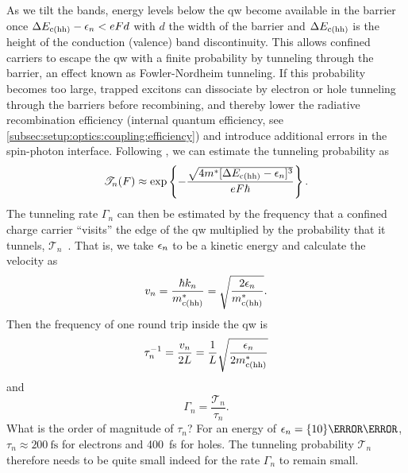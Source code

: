 As we tilt the bands, energy levels below the \gls{qw} become available in the barrier once $\Delta E_{\mathrm{c}(\mathrm{hh})} - \epsilon_{n} < eFd$ with $d$ the width of the barrier and $\Delta E_{\mathrm{c}(\mathrm{hh})}$ is the height of the conduction (valence) band discontinuity.
This allows confined carriers to escape the \gls{qw} with a finite probability by tunneling through the barrier, an effect known as Fowler-Nordheim tunneling.
If this probability becomes too large, trapped excitons can dissociate by electron or hole tunneling through the barriers before recombining, and thereby lower the radiative recombination efficiency (internal quantum efficiency, see \cref{subsec:setup:optics:coupling:efficiency}) and introduce additional errors in the spin-photon interface.
Following , we can estimate the tunneling probability as
\begin{equation}\label{eq:exp:theory:qcse:tunneling:probability}
    \mathscr{T}_n(F) \approx \exp\left\lbrace -\frac{\sqrt{4 m^\ast [\Delta E_{\mathrm{c}(\mathrm{hh})} - \epsilon_n]^3}}{e F\hbar}\right\rbrace.
\end{equation}
The tunneling rate $\Gamma_n$ can then be estimated by the frequency that a confined charge carrier \enquote{visits} the edge of the \gls{qw} multiplied by the probability that it tunnels, $\mathscr{T}_n$~\cite{Larsson1988}.
That is, we take $\epsilon_n$ to be a kinetic energy and calculate the velocity as
\begin{equation}
    v_n = \frac{\hbar k_n}{m^\ast_{\mathrm{c}(\mathrm{hh})}} = \sqrt{\frac{2 \epsilon_n}{m^\ast_{\mathrm{c}(\mathrm{hh})}}}.
\end{equation}
Then the frequency of one round trip inside the \gls{qw} is
\begin{equation}
    \tau_n^{-1} = \frac{v_n}{2L} = \frac{1}{L}\sqrt{\frac{\epsilon_n}{2 m^\ast_{\mathrm{c}(\mathrm{hh})}}}
\end{equation}
and
\begin{equation}\label{eq:exp:theory:qcse:tunneling:rate}
    \Gamma_n = \frac{\mathscr{T}_n}{\tau_n}.
\end{equation}
What is the order of magnitude of $\tau_n$?
For an energy of $\eps_n = \qty{10}{\milli\electronvolt}$, $\tau_n\approx\qty{200}{\femto\second}$ for electrons and \qty{400}{\femto\second} for holes.
The tunneling probability $\mathscr{T}_n$ therefore needs to be quite small indeed for the rate $\Gamma_n$ to remain small.

